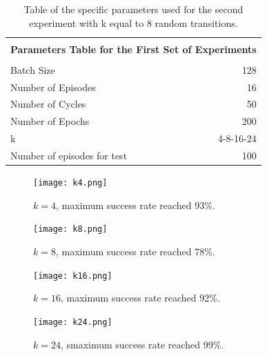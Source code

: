 \documentclass[a4paper]{report}
\begin{document}
\begin{table}[h]
\begin{center}
\begin{tabular}{|l|r|} 



\hline

\multicolumn{2}{|c|}{}\\
\multicolumn{2}{|c|}{\textbf{\large    Parameters Table for the First Set of Experiments}}\\
\multicolumn{2}{|c|}{}\\

\hline

Batch Size 					& 128			\\
Number of Episodes			& 16			\\
Number of Cycles			& 50			\\
Number of Epochs			& 200			\\
k							& 4-8-16-24		\\
Number of episodes for test	& 100			\\


\hline
\end{tabular}
\end{center}
\caption{\label{exp2} Table of the specific parameters used for the second experiment with k equal to 8 random transitions.}
\end{table}

\begin{figure}[h!]
\begin{minipage}[b]{0.47\textwidth}
\centering
\texttt{[image: k4.png]}
\caption{\label{k4}  $k=4$, maximum success rate reached 93\%.}
\end{minipage}
\hfill
\begin{minipage}[b]{0.47\textwidth}
\centering
\texttt{[image: k8.png]}
\caption{\label{k8} $k=8$, maximum success rate reached 78\%.}
\end{minipage}
\hfill
\begin{minipage}[b]{0.47\textwidth}
\centering
\texttt{[image: k16.png]}
\caption{\label{k16}$k=16$, maximum success rate reached 92\%.}
\end{minipage}
\hfill
\begin{minipage}[b]{0.47\textwidth}
\centering
\texttt{[image: k24.png]}
\caption{\label{k24} $k=24$, smaximum success rate reached 99\%.}
\end{minipage}
\end{figure}
\end{document}
